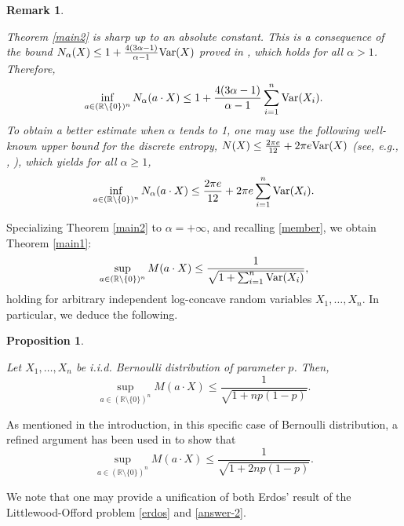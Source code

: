 \documentclass[11pt]{article}
\newtheorem{remark}[thm]{Remark}
\newtheorem{prop}[thm]{Proposition}
\newcommand{\R}{\mathbb{R}}
\DeclareMathOperator{\Var}{Var}
\newcommand{\1}{[1]}
\def\Var{{\rm Var}}
\begin{document}
\begin{remark}\label{sharp}

Theorem \ref{main2} is sharp up to an absolute constant. This is a consequence of the bound $N_{\alpha}(X) \leq 1 + \frac{4(3 \alpha - 1)}{\alpha - 1} \Var(X)$ proved in \cite{BMM}, which holds for all $\alpha > 1$. Therefore,
$$ \inf_{a \in (\R \setminus \{0\})^n} N_\alpha(a \cdot X) \leq 1 + \frac{4(3 \alpha - 1)}{\alpha - 1} \sum_{i=1}^n \Var(X_i). $$
To obtain a better estimate when $\alpha$ tends to 1, one may use the following well-known upper bound for the discrete entropy, $N(X) \leq \frac{2 \pi e}{12} + 2\pi e \Var(X)$ (see, e.g., \cite{Massey}, \cite{BM}), which yields for all $\alpha \geq 1$,
$$ \inf_{a \in (\R \setminus \{0\})^n} N_\alpha(a \cdot X) \leq \frac{2 \pi e}{12} + 2 \pi e\sum_{i=1}^n \Var(X_i). $$
    
\end{remark}


Specializing Theorem \ref{main2} to $\alpha = +\infty$, and recalling \eqref{member}, we obtain Theorem \ref{main1}:
\begin{equation}\label{M-function}
\sup_{a \in (\R \setminus \{0\})^n} M(a \cdot X) \leq \frac{1}{\sqrt{1 + \sum_{i=1}^n \Var(X_i)}},
\end{equation}
holding for arbitrary independent log-concave random variables $X_1, \dots, X_n$. In particular, we deduce the following.










\begin{prop}\label{answer}

Let $X_1, \dots, X_n$ be i.i.d. Bernoulli distribution of parameter $p$. Then,
$$ \sup_{a \in (\R \setminus \{0\})^n} M(a \cdot X) \leq \frac{1}{\sqrt{1 + np(1-p)}}. $$

\end{prop}



As mentioned in the introduction, in this specific case of Bernoulli distribution, a refined argument has been used in \cite{MMR} to show that 
\begin{equation}\label{answer-2}
\sup_{a \in (\R \setminus \{0\})^n} M(a \cdot X) \leq \frac{1}{\sqrt{1 + 2np(1-p)}}.
\end{equation}


We note that one may provide a unification of both Erdos' result of the Littlewood-Offord problem \eqref{erdos} and \eqref{answer-2}.
\end{document}
